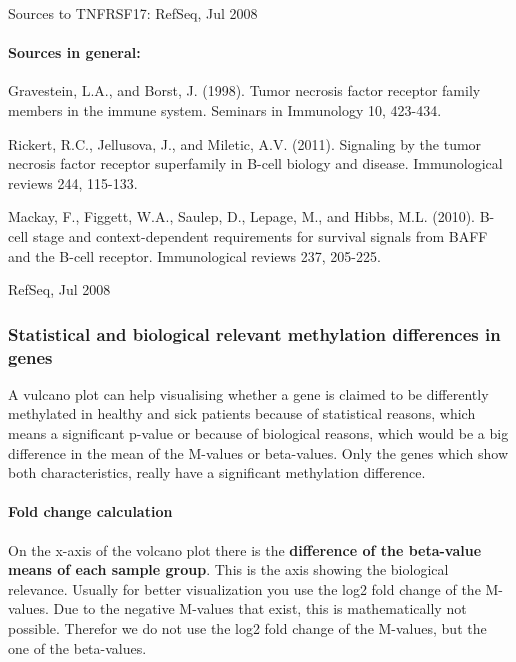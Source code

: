 \documentclass[]{article}
\let\oldparagraph\paragraph
\renewcommand{\paragraph}[1]{\oldparagraph{#1}\mbox{}}
\begin{document}
Sources to TNFRSF17: RefSeq, Jul 2008

\paragraph{Sources in general:}\label{sources-in-general}

Gravestein, L.A., and Borst, J. (1998). Tumor necrosis factor receptor
family members in the immune system. Seminars in Immunology 10, 423-434.

Rickert, R.C., Jellusova, J., and Miletic, A.V. (2011). Signaling by the
tumor necrosis factor receptor superfamily in B-cell biology and
disease. Immunological reviews 244, 115-133.

Mackay, F., Figgett, W.A., Saulep, D., Lepage, M., and Hibbs, M.L.
(2010). B-cell stage and context-dependent requirements for survival
signals from BAFF and the B-cell receptor. Immunological reviews 237,
205-225.

RefSeq, Jul 2008

\subsubsection{Statistical and biological relevant methylation
differences in
genes}\label{statistical-and-biological-relevant-methylation-differences-in-genes}

A vulcano plot can help visualising whether a gene is claimed to be
differently methylated in healthy and sick patients because of
statistical reasons, which means a significant p-value or because of
biological reasons, which would be a big difference in the mean of the
M-values or beta-values. Only the genes which show both characteristics,
really have a significant methylation difference.

\paragraph{Fold change calculation}\label{fold-change-calculation}

On the x-axis of the volcano plot there is the \textbf{difference of the
beta-value means of each sample group}. This is the axis showing the
biological relevance. Usually for better visualization you use the log2
fold change of the M-values. Due to the negative M-values that exist,
this is mathematically not possible. Therefor we do not use the log2
fold change of the M-values, but the one of the beta-values.
\end{document}
